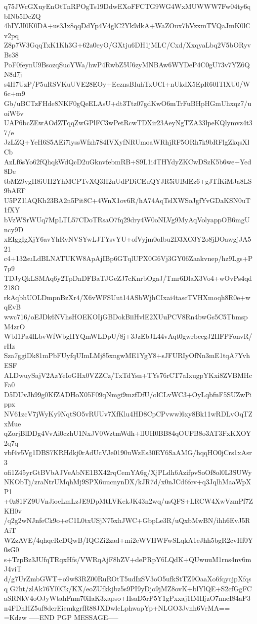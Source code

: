 q75JWcGXuyEnOtTnRPOgTs19DdwEXoFFCTG9WG4WxMUWWW7Fw04ty6qbINb5DcZQ
4hIYJI0K0DA+us3Jx8qqDdYp4V4glC2Yk9dkA+WaZOux7bVzxmTVQaJmK0lCv2pq
Z8p7W3GqqTxK1Kh3G+62a0eyO/GXtju6DH1jMLC/Cxd/XxqyaLbq2V5bORyvBs38
PoF0feynU9BsozqSucYWa/hwP4RwbZ5U6zyMNBAw6WYDeP4C0gU73v7YZ6QN8d7j
s4H7UzP/P5uRSVKuUVE28EOy+EcznsBIuhTxUCI+nUkdX5EpR60ITlXU0/W6c+m9
Gb/uBCTzFHde8NKF0gQeELAsU+dt3Ttz07gdKwO6mTrFuBHpHGmUhxqz7/uoiW6v
UAP6bcZEwAOdZTqqZwGPlFC3wPetRcwTDXir23AeyNgTZA33lpeKQlymvz4t37/e
JzLZQ+YeH6S5AEi7iyssWfzh784IVXyfNRUmoaWRhjRF5ORh7k9bRFlgZkqsXlCb
AzLf6sYo62fQhqkWdQcD2uGknvfebmRB+S9L1i4THYdyZKCwDSzK5b6we+Yed8De
tbMZ9vgH8iUH2YhMCPTvXQ3H2nUdPDiCEuQYJR5iUBdEz6+gJTfKiMJa8LS9bAEF
U5PZ1lAQKh23BA2n5Pit8C+4WnX1ov6R/hA74AqTslXWSoJgfYvGDaKSN0uT1fXY
bVzWSrWUq7MpLTL57CDoTRsaO7fq29dry4W0oNLVg9MyAqVolyappOB6mgUncy9D
xEIggIgXjY6avYhRvNVSYwLJTYsvYU+ofVyjm0oIbu2D3XO3Y2o8jDOawgjJA521
c4+132suLdBLNATUKW8ApAjIBp6GTqlUPX0G6Vj3GY06Zaakvnep/hz9Lgs+P7p9
TDJyQkLSMAq6y2TpDnDFBaTJGeZJ7cKnrbOgaJ/Tmr6DlaX3Vo4+wOvPs4qd218O
rkAqbhUOLDmpnBzXr4/X6vWFSUut14ASbWjhCIxai4tascTVHXmoqh8R0e+wqEvB
wwc716/oEJDk6NVhsHOEKOIjGBDokBiiHvlE2XUuPCV8Rn4bwGs5C5TbmspM4zrO
WbI1Pa4lLbvWfWbgHYQmWLDpU/8j+3JzEbJL44vAqt0gwrbcegJ2HFPFonvR/rHz
Sza7ggiDk81mPbFUyfqUImLMj85xngwME1YgY8+sJFURIyOfNn3mE1tqA7YvhESF
ALDwuySajV2AzYeIoGHx0VZZCz/TxTdYsn+TYs76rCT7aIxugpYKxi8ZVBMHcFa0
D5DUvJh99g0KfZADHoX05F09qNmgi9mzfDfU/olCLvWC3+OyLqbfnF5SUZwPippx
NV61zcV7jWyKy9NqtSO5vRUUv7XfKlu4HD8CpCPvwwl6xy8Bk11wRDLvOqTZxMue
qZorjBlDDg4VvAi0czhU1NxJV0WztmWdh+lIUH0BB84qOUFB8o3AT3FxKXOY2q7q
vbf4v5Vg1DBS7KRHdkj0rAdUcVJe0190uWzEs30EY6SaAMG/hqqHO0jCrs1xAsr3
ofi1Z45yrGtBVbAJVeAbNE1BX42rqCemYA6g/XjPLdh6AzifpvSoOf8ol0L3SUWy
NKObTj/zraNtrUMqhMj9SPX6uucnynDX/kJR7d/x0nJCd6fcv+q3JqlhMaaWpXP1
+0z81FZ9UVnJioeLmLzJE9DpMtLVKekJK43n2wq/usQFS+LRCW4XwVzmPf7ZKH0v
/q2g2wNJnfeCk9o+eC1L0txUSjN75xhJWC+GbpLe3R/uQxbMwBN/ihh6EvJ5RAiT
WZzAVE/4qhqcRcDQwB/IQGZi2zad+mi2eWVHWFwSLqkA1eJhh5bgR2cvHf0Y0sG0
s+TzpBz3JUfqTRqxHfs/VWRqAjF8hZV+dePRpY6LQdK+QUwuuM1rns4nv6mJ4viT
d/g7UrZmbGWT+o9w83RZ00RuROtT5udIzSV3oO5ufkStTZ9OaaXo6fqycjpXfqsq
G7ht/zlAk76Y0lCk/KX/eoZUfkkjbz5s9PI9yDjo9jMZ8ovK+blYlQE+S2cfGgFC
aSRNkV4oOJyWtahFnm70iIaK3xapso+HsaD5rP5Y1gPxxaj1IMHjzO7nneI84aP3
n4FDhHZ5uf8dcrEiemkgrfR88JXDwlcLphwapYp+NLGO3Jvnh6VrMA==
=Kdzw
-----END PGP MESSAGE-----
